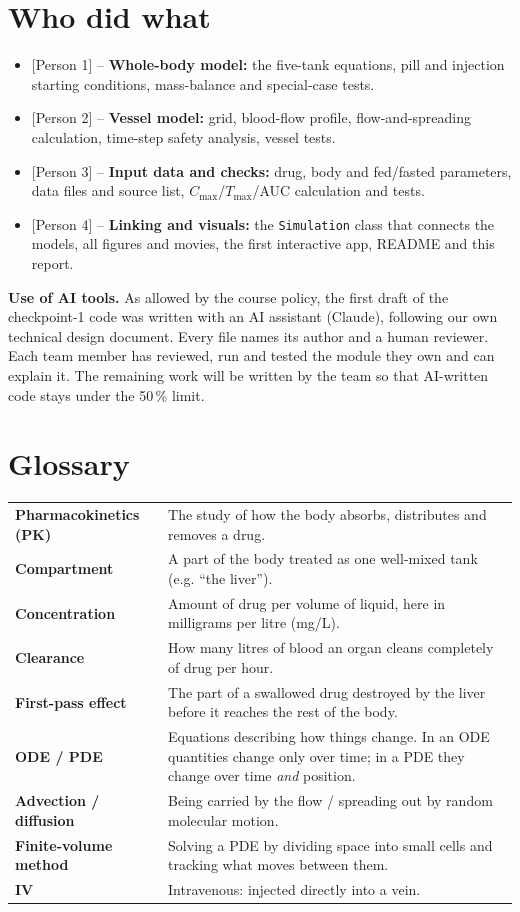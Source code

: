 \documentclass[10.5pt]{article}
\newcommand{\todo}[1]{\textcolor{red!70!black}{#1}}
\begin{document}
\section{Who did what}
\begin{itemize}
\item \todo{[Person 1]} -- \textbf{Whole-body model:} the five-tank equations, pill and injection starting conditions,
mass-balance and special-case tests.
\item \todo{[Person 2]} -- \textbf{Vessel model:} grid, blood-flow profile, flow-and-spreading calculation,
time-step safety analysis, vessel tests.
\item \todo{[Person 3]} -- \textbf{Input data and checks:} drug, body and fed/fasted parameters, data files and
source list, $C_{\max}$/$T_{\max}$/AUC calculation and tests.
\item \todo{[Person 4]} -- \textbf{Linking and visuals:} the \texttt{Simulation} class that connects the models,
all figures and movies, the first interactive app, README and this report.
\end{itemize}
\textbf{Use of AI tools.} As allowed by the course policy, the first draft of the checkpoint-1 code was written with an AI
assistant (Claude), following our own technical design document. Every file names its author and a human reviewer.
Each team member has reviewed, run and tested the module they own and can explain it. The remaining work will be written
by the team so that AI-written code stays under the 50\,\% limit.

\section*{Glossary}
{\small
\begin{tabularx}{\linewidth}{@{}l X@{}}
\textbf{Pharmacokinetics (PK)} & The study of how the body absorbs, distributes and removes a drug.\\
\textbf{Compartment} & A part of the body treated as one well-mixed tank (e.g. ``the liver'').\\
\textbf{Concentration} & Amount of drug per volume of liquid, here in milligrams per litre (mg/L).\\
\textbf{Clearance} & How many litres of blood an organ cleans completely of drug per hour.\\
\textbf{First-pass effect} & The part of a swallowed drug destroyed by the liver before it reaches the rest of the body.\\
\textbf{ODE / PDE} & Equations describing how things change. In an ODE quantities change only over time; in a PDE they
change over time \emph{and} position.\\
\textbf{Advection / diffusion} & Being carried by the flow / spreading out by random molecular motion.\\
\textbf{Finite-volume method} & Solving a PDE by dividing space into small cells and tracking what moves between them.\\
\textbf{IV} & Intravenous: injected directly into a vein.\\
\end{tabularx}}
\end{document}
